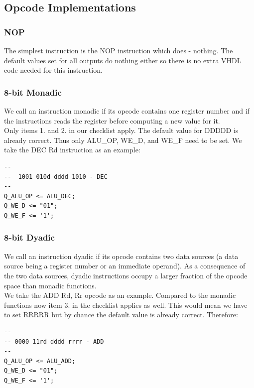 \documentclass[12pt,a4paper]{report}
\begin{document}
\subsection{Opcode Implementations}
\subsubsection{NOP}
The simplest instruction is the NOP instruction which does - nothing. The default values set for all outputs do nothing either so there is no extra VHDL code needed for this instruction.
\subsubsection{8-bit Monadic}
We call an instruction monadic if its opcode contains one register number and if the instructions reads the register before computing a new value for it.\\
Only items 1. and 2. in our checklist apply. The default value for DDDDD is already correct. Thus only ALU\_OP, WE\_D, and WE\_F need to be set. We take the DEC Rd instruction as an example:\\
\begin{lstlisting}
--
--  1001 010d dddd 1010 - DEC
--
Q_ALU_OP <= ALU_DEC;
Q_WE_D <= "01";
Q_WE_F <= '1';
\end{lstlisting}
\subsubsection{8-bit Dyadic}
We call an instruction dyadic if its opcode contains two data sources (a data source being a register number or an immediate operand). As a consequence of the two data sources, dyadic instructions occupy a larger fraction of the opcode space than monadic functions.\\
We take the ADD Rd, Rr opcode as an example.
Compared to the monadic functions now item 3. in the checklist applies as well. This would mean we have to set RRRRR but by chance the default value is already correct. Therefore:
\begin{lstlisting}
--
-- 0000 11rd dddd rrrr - ADD
--
Q_ALU_OP <= ALU_ADD;
Q_WE_D <= "01";
Q_WE_F <= '1';
\end{lstlisting}
\end{document}
